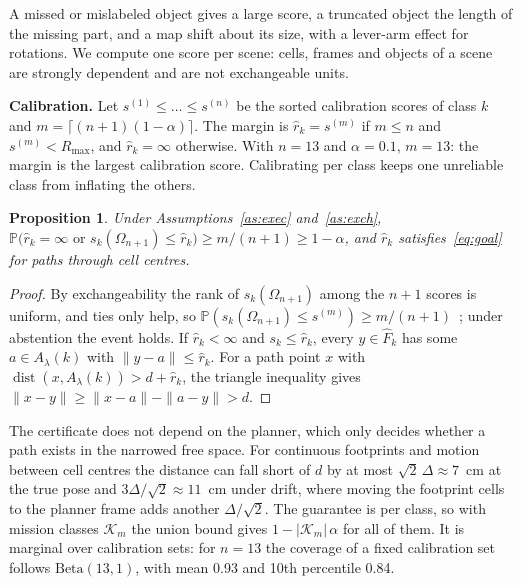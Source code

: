 \documentclass[conference]{IEEEtran}
\newtheorem{proposition}{Proposition}
\theoremstyle{definition}
\begin{document}
A missed or mislabeled object gives a large score, a truncated object the length of the missing part, and a map shift
about its size, with a lever-arm effect for rotations. We compute one score per scene: cells, frames and objects of a
scene are strongly dependent and are not exchangeable units.

\textbf{Calibration.} Let $s^{(1)} \le \dots \le s^{(n)}$ be the sorted calibration scores of class $k$ and
$m = \lceil (n + 1)(1 - \alpha) \rceil$. The margin is $\hat r_k = s^{(m)}$ if $m \le n$ and $s^{(m)} < R_{\max}$, and
$\hat r_k = \infty$ otherwise. With $n = 13$ and $\alpha = 0.1$, $m = 13$: the margin is the largest calibration score.
Calibrating per class keeps one unreliable class from inflating the others.

\begin{proposition}\label{prop:valid}
Under Assumptions~\ref{as:exec} and~\ref{as:exch},
$\mathbb P\bigl(\hat r_k = \infty \text{ or } s_k(\Omega_{n+1}) \le \hat r_k\bigr) \ge m/(n + 1) \ge 1 - \alpha$, and
$\hat r_k$ satisfies~\eqref{eq:goal} for paths through cell centres.
\end{proposition}
\begin{proof}
By exchangeability the rank of $s_k(\Omega_{n+1})$ among the $n + 1$ scores is uniform, and ties only help, so
$\mathbb P(s_k(\Omega_{n+1}) \le s^{(m)}) \ge m/(n + 1)$~\cite{gentle}; under abstention the event holds. If
$\hat r_k < \infty$ and $s_k \le \hat r_k$, every $y \in \hat F_k$ has some $a \in A_\lambda(k)$ with
$\|y - a\| \le \hat r_k$. For a path point $x$ with $\operatorname{dist}(x, A_\lambda(k)) > d + \hat r_k$, the triangle
inequality gives $\|x - y\| \ge \|x - a\| - \|a - y\| > d$.
\end{proof}

The certificate does not depend on the planner, which only decides whether a path exists in the narrowed free space.
For continuous footprints and motion between cell centres the distance can fall short of $d$ by at most
$\sqrt 2\,\Delta \approx 7$~cm at the true pose and $3\Delta/\sqrt 2 \approx 11$~cm under drift, where moving the footprint
cells to the planner frame adds another $\Delta/\sqrt 2$. The guarantee is per class, so with mission classes $\mathcal K_m$ the union bound gives
$1 - |\mathcal K_m|\,\alpha$ for all of them. It is marginal over calibration sets: for $n = 13$ the coverage of a fixed
calibration set follows $\mathrm{Beta}(13, 1)$, with mean 0.93 and 10th percentile 0.84.
\end{document}
